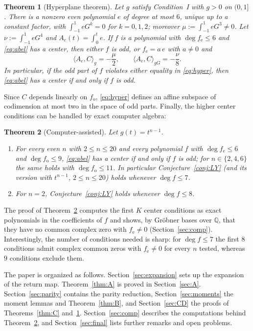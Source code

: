 \documentclass[11pt]{amsart}
\numberwithin{equation}{section}
\theoremstyle{plain}
\newtheorem{mainthm}{Theorem}
\theoremstyle{definition}
\theoremstyle{remark}
\newcommand{\Q}{\mathbb{Q}}
\newcommand{\fe}{f_{\mathrm e}}
\newcommand{\fo}{f_{\mathrm o}}
\newcommand{\ip}[2]{\langle #1,#2\rangle}
\begin{document}
\begin{mainthm}[Hyperplane theorem]\label{thm:D}
Let $g$ satisfy Condition~I with $g>0$ on $(0,1]$. There is a nonzero even
polynomial $e$ of degree at most $6$, unique up to a constant factor, with
$\int_{-1}^1eG^k=0$ for $k=0,1,2$; moreover $\mu:=\int_{-1}^1eG^3\ne0$. Let
$\nu:=\int_{-1}^1eG^4$ and $A_e(t)=\int_0^te$. If $f$ is a polynomial with
$\deg\fe\le6$ and \eqref{eq:abel} has a center, then either $f$ is odd, or
$\fe=a\,e$ with $a\ne0$ and
\begin{equation}\label{eq:hyper}
 \ip{A_e}{C}_g=-\frac{\mu}{2},\qquad \ip{A_e}{C}_{gG}=-\frac{\nu}{8}.
\end{equation}
In particular, if the odd part of $f$ violates either equality in
\eqref{eq:hyper}, then \eqref{eq:abel} has a center if and only if $f$ is odd.
\end{mainthm}

Since $C$ depends linearly on $\fo$, \eqref{eq:hyper} defines an affine subspace
of codimension at most two in the space of odd parts. Finally, the higher center
conditions can be handled by exact computer algebra:

\begin{mainthm}[Computer-assisted]\label{thm:E}
Let $g(t)=t^{n-1}$.
\begin{enumerate}[label=\textup{(\roman*)}]
\item For every even $n$ with $2\le n\le20$ and every polynomial $f$ with
 $\deg\fe\le6$ and $\deg\fo\le9$, \eqref{eq:abel} has a center if and only if $f$
 is odd; for $n\in\{2,4,6\}$ the same holds with $\deg\fo\le11$. In particular
 Conjecture~\ref{conj:LY} (and its version with $t^{n-1}$, $2\le n\le 20$) holds
 whenever $\deg f\le7$.
\item For $n=2$, Conjecture~\ref{conj:LY} holds whenever $\deg f\le8$.
\end{enumerate}
\end{mainthm}

The proof of Theorem~\ref{thm:E} computes the first $K$ center conditions as
exact polynomials in the coefficients of $f$ and shows, by Gr\"obner bases over
$\Q$, that they have no common complex zero with $\fe\ne0$
(Section~\ref{sec:comp}). Interestingly, the number of conditions needed is
sharp: for $\deg f\le7$ the first $8$ conditions admit complex common zeros with
$\fe\ne0$ for every $n$ tested, whereas $9$ conditions exclude them.

The paper is organized as follows. Section~\ref{sec:expansion} sets up the
expansion of the return map. Theorem~\ref{thm:A} is proved in
Section~\ref{sec:A}. Section~\ref{sec:parity} contains the parity reduction,
Section~\ref{sec:moments} the moment lemmas and Theorem~\ref{thm:B}, and
Section~\ref{sec:CD} the proofs of Theorems~\ref{thm:C} and~\ref{thm:D}.
Section~\ref{sec:comp} describes the computations behind Theorem~\ref{thm:E}, and
Section~\ref{sec:final} lists further remarks and open problems.
\end{document}
